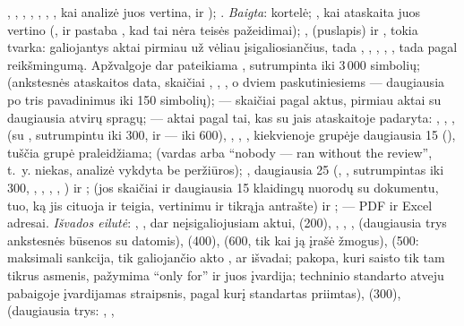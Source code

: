 \begin{description}[style=multiline, leftmargin=19mm, labelwidth=17mm, labelsep=2mm,
  font=\sffamily\bfseries\footnotesize\color{ink}, itemsep=1pt, topsep=2pt, before=\raggedright]
    , , , ,
    , , , kai analizė juos vertina, ir
    ); .
    \emph{Baigta}: kortelė; , kai ataskaita juos vertino (,
     ir pastaba , kad tai nėra teisės pažeidimai);
    ,  (puslapis) ir , tokia
    tvarka: galiojantys aktai pirmiau už vėliau įsigaliosiančius, tada ,
    , , , , tada pagal
    reikšmingumą. Apžvalgoje dar pateikiama , sutrumpinta iki 3\,000 simbolių;
     (ankstesnės ataskaitos data, skaičiai , ,
    , o dviem paskutiniesiems --- daugiausia po tris pavadinimus iki 150 simbolių);
     --- skaičiai pagal aktus, pirmiau aktai su daugiausia atvirų spragų;
     --- aktai pagal tai, kas su jais ataskaitoje padaryta: ,
    , ,  (su , sutrumpintu iki
    300, ir  --- iki 600), , ,
    , kiekvienoje grupėje daugiausia 15 (), tuščia
    grupė praleidžiama;  (vardas arba \enquote{nobody --- ran without the
    review}, t.~y. niekas, analizė vykdyta be peržiūros); , daugiausia 25
    (, , sutrumpintas iki 300, , ,
    , , ) ir ;
     (jos skaičiai ir daugiausia 15 klaidingų nuorodų su dokumentu, tuo, ką
    jis cituoja ir teigia, vertinimu ir tikrąja antrašte) ir ;
     --- PDF ir Excel adresai.
    \emph{Išvados eilutė}: , ,  dar neįsigaliojusiam
    aktui,  (200), , , ,
     (daugiausia trys ankstesnės būsenos su datomis),  (400),
     (600, tik kai ją įrašė žmogus),  (500: maksimali sankcija, tik
    galiojančio akto ,  ar  išvadai; pakopa, kuri
    saisto tik tam tikrus asmenis, pažymima \enquote{only for} ir juos įvardija; techninio
    standarto atveju pabaigoje įvardijamas straipsnis, pagal kurį standartas priimtas),
     (300),  (daugiausia trys: , ,

\end{description}
